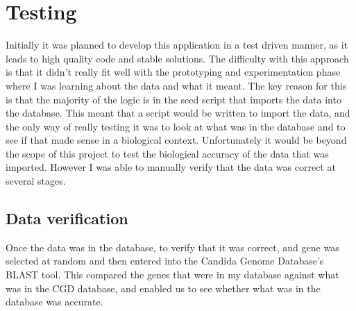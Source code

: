 \section{Testing}





Initially it was planned to develop this application in a test driven manner, as it leads to high quality code and stable solutions. The difficulty with this approach is that it didn't really fit well with the prototyping and experimentation phase where I was learning about the data and what it meant. The key reason for this is that the majority of the logic is in the seed script that imports the data into the database. This meant that a script would be written to import the data, and the only way of really testing it was to look at what was in the database and to see if that made sense in a biological context. Unfortunately it would be beyond the scope of this project to test the biological accuracy of the data that was imported. However I was able to manually verify that the data was correct at several stages. 

\subsection{Data verification}
Once the data was in the database, to verify that it was correct, and gene was selected at random and then entered into the Candida Genome Database's\cite{cgd} BLAST tool. This compared the genes that were in my database against what was in the CGD database, and enabled us to see whether what was in the database was accurate. 

